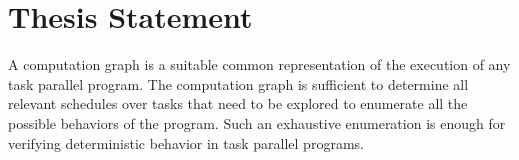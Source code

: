 \section{Thesis Statement}
A computation graph is a suitable common representation of the execution of any task parallel program. The computation graph is sufficient to determine all relevant schedules over tasks that need to be explored to enumerate all the possible behaviors of the program. Such an exhaustive enumeration is enough for verifying deterministic behavior in task parallel programs.
